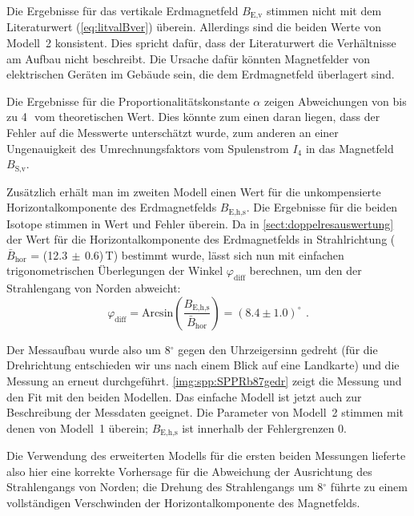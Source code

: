 Die Ergebnisse für das vertikale Erdmagnetfeld $B_\text{E,v}$ stimmen nicht mit dem Literaturwert (\autoref{eq:litvalBver}) überein.
Allerdings sind die beiden Werte von Modell~2 konsistent.
Dies spricht dafür,
dass der Literaturwert die Verhältnisse am Aufbau nicht beschreibt.
Die Ursache dafür könnten Magnetfelder von elektrischen Geräten im Gebäude sein,
die dem Erdmagnetfeld überlagert sind.


Die Ergebnisse für die Proportionalitätskonstante $\alpha$ zeigen Abweichungen von bis zu
4\,\textsigma\ vom theoretischen Wert.
Dies könnte zum einen daran liegen, dass der Fehler auf die Messwerte unterschätzt wurde,
zum anderen an einer Ungenauigkeit des Umrechnungsfaktors vom Spulenstrom $I_4$ in das Magnetfeld $B_\text{S,v}$.

Zusätzlich erhält man im zweiten Modell einen Wert für die unkompensierte Horizontalkomponente des Erdmagnetfelds $B_\text{E,h,s}$.
Die Ergebnisse für die beiden Isotope stimmen in Wert und Fehler überein.
Da in \autoref{sect:doppelresauswertung} der Wert für die Horizontalkomponente des Erdmagnetfelds in
Strahlrichtung ($\bar{B}_\text{hor}$ = (12.3$\,\pm\,$0.6)\,\textmu T) bestimmt wurde,
lässt sich nun mit einfachen trigonometrischen Überlegungen der Winkel $\varphi_\text{diff}$ berechnen,
um den der Strahlengang von Norden abweicht:
\begin{equation}
  \varphi_\text{diff} = \text{Arcsin}\left( \frac{B_\text{E,h,s}}{\bar{B}_\text{hor}} \right)
   = (8.4 \pm 1.0)^\circ  \ \, .
\end{equation}

Der Messaufbau wurde also um 8$^\circ$ gegen den Uhrzeigersinn gedreht
(für die Drehrichtung entschieden wir uns nach einem Blick auf eine Landkarte)
und die Messung an  erneut durchgeführt.
\autoref{img:spp:SPPRb87gedr} zeigt die Messung und den Fit mit den beiden Modellen.
Das einfache Modell ist jetzt auch zur Beschreibung der Messdaten geeignet.
Die Parameter von Modell~2 stimmen mit denen von Modell~1 überein;
$B_\text{E,h,s}$ ist innerhalb der Fehlergrenzen 0.

Die Verwendung des erweiterten Modells für die ersten beiden Messungen lieferte also hier eine korrekte Vorhersage
für die Abweichung der Ausrichtung des Strahlengangs von Norden;
die Drehung des Strahlengangs um 8$^\circ$ führte zu einem vollständigen Verschwinden der Horizontalkomponente
des Magnetfelds.

